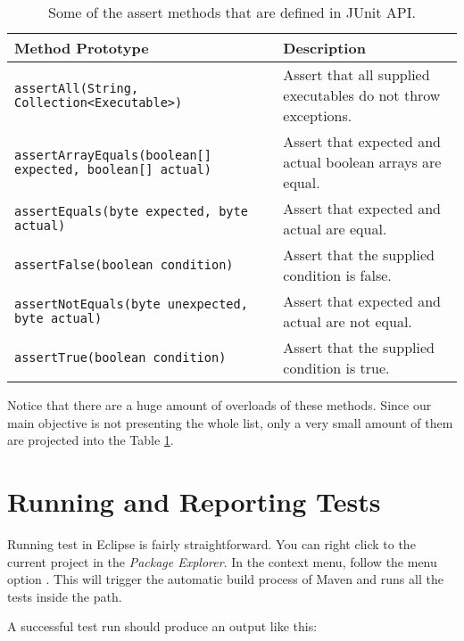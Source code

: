 \begin{table}[H]
    \centering
    \renewcommand{\arraystretch}{1.2}
    \caption{Some of the assert methods that are defined in JUnit API.}
    \label{tab:junit-asserts}
    \begin{adjustbox}{max width=\textwidth}
        \begin{tabular}{ll}
            \toprule
            Method Prototype & Description \\
            \midrule
            \lstinline!assertAll(String, Collection<Executable>)! & Assert that all supplied executables do not throw exceptions.\\
            \lstinline!assertArrayEquals(boolean[] expected, boolean[] actual)! & Assert that expected and actual boolean arrays are equal.\\
            \lstinline!assertEquals(byte expected, byte actual)! & Assert that expected and actual are equal.\\
            \lstinline!assertFalse(boolean condition)! & Assert that the supplied condition is false.\\
            \lstinline!assertNotEquals(byte unexpected, byte actual)! & Assert that expected and actual are not equal.\\
            \lstinline!assertTrue(boolean condition)! & Assert that the supplied condition is true.\\
            \bottomrule
        \end{tabular}
    \end{adjustbox}
\end{table}

Notice that there are a huge amount of overloads of these methods. Since our main objective is not presenting the whole list, only a very small amount of them are projected into the Table \ref{tab:junit-asserts}.

\section{Running and Reporting Tests}
Running test in Eclipse is fairly straightforward. You can right click to the current project in the \emph{Package Explorer}. In the context menu, follow the menu option . This will trigger the automatic build process of Maven and runs all the tests inside the  path.

A successful test run should produce an output like this:

